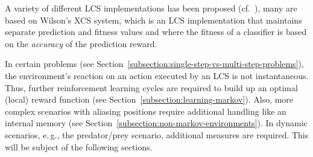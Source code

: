 A variety of different LCS implementations has been proposed (cf.~\cite{Kov02a}), many are based on Wilson's XCS \cite{Wil95} system, which is an LCS implementation that maintains separate prediction and fitness values and where the fitness of a classifier is based on the \emph{accuracy} of the prediction reward.  




In certain problems (see Section~\ref{subsection:single-step-vs-multi-step-problems}), the environment's reaction on an action executed by an LCS is not instantaneous. Thus, further reinforcement learning cycles are required to build up an optimal (local) reward function (see Section~\ref{subsection:learning-markov}). Also, more complex scenarios with aliasing positions require additional handling like an internal memory (see Section~\ref{subsection:non-markov-environments}). In dynamic scenarios, e.\,g., the predator/prey scenario, additional measures are required. This will be subject of the following sections.

